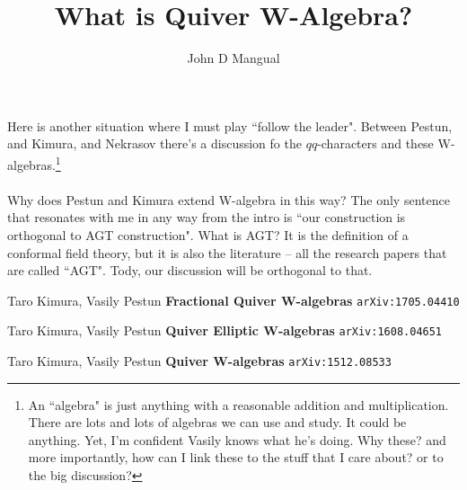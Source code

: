 \documentclass[12pt]{article}
\title{What is Quiver W-Algebra?}
\author{John D Mangual}
\date{}
\begin{document}
\selectfont \fontsize{12.5}{15}\selectfont

\maketitle

\noindent Here is another situation where I must play ``follow the leader".  Between Pestun, and Kimura, and Nekrasov there's a discussion fo the $qq$-characters and these W-algebras.\footnote{An ``algebra" is just anything with a reasonable addition and multiplication. There are lots and lots of algebras we can use and study. It could be anything.  Yet, I'm confident Vasily knows what he's doing.  Why these?  and more importantly, how can I link these to the stuff that I care about? or to the big discussion?} \\ \\
Why does Pestun and Kimura extend W-algebra in this way?  The only sentence that resonates with me in any way from the intro is ``{\color{red!50!orange}our construction is orthogonal to AGT construction}".  What is AGT?  It is the definition of a conformal field theory, but it is also the literature -- all the research papers that are called ``AGT".  Tody, our discussion will be orthogonal to that.
\vfill

\begin{thebibliography}{}

\item Taro Kimura, Vasily Pestun \textbf{Fractional Quiver W-algebras} \texttt{arXiv:1705.04410}

\item Taro Kimura, Vasily Pestun \textbf{Quiver Elliptic W-algebras} \texttt{arXiv:1608.04651}

\item Taro Kimura, Vasily Pestun \textbf{Quiver W-algebras} \texttt{arXiv:1512.08533}






\end{thebibliography}
\end{document}
